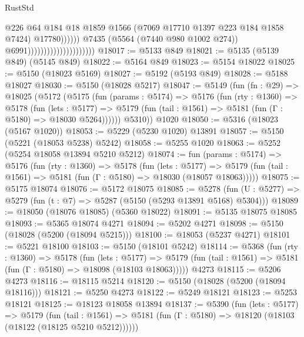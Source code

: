 \begin{lexlean}{RustStd}
\begin{coremodule}
                                                          @226
                                                          @64
                                                          @184
                                                          @18
                                                          @1859
                                                          @1566
                                                          (@7069 @17710 @1397 @223 @184 @1858 @7424)
                                                          @17780))))))
                                              @7435
                                              (@5564 (@7440 @980 @1002 @274))
                                              @6991)))))))))))))))))))))
@18017 := @5133 @849
@18021 := @5135 (@5139 @849) (@5145 @849)
@18022 := @5164 @849
@18023 := @5154 @18022
@18025 := @5150 (@18023 @5169)
@18027 := @5192 (@5193 @849)
@18028 := @5188 @18027
@18030 := @5150 (@18028 @5217)
@18047 := @5149
    (fun (fn : @29) =>
    @18025
      (@5172
        (@5175
          (fun (params : @5174) =>
          @5176
            (fun (rty : @1360) =>
            @5178
              (fun (lets : @5177) =>
              @5179 (fun (tail : @1561) => @5181 (fun (Γ : @5180) => @18030 @5264))))))
        @5310))
    @1020
@18050 := @5316 (@18023 (@5167 @1020))
@18053 := @5229 (@5230 @1020) @13891
@18057 := @5150 (@5221 (@18053 @5238) @5242)
@18058 := @5255 @1020
@18063 := @5252 (@5254 @18058 @13894 @5210 @5212)
@18074 := fun (params : @5174) =>
  @5176
    (fun (rty : @1360) =>
    @5178
      (fun (lets : @5177) =>
      @5179 (fun (tail : @1561) => @5181 (fun (Γ : @5180) => @18030 (@18057 @18063)))))
@18075 := @5175 @18074
@18076 := @5172 @18075
@18085 := @5278
    (fun (U : @5277) => @5279 (fun (t : @7) => @5287 (@5150 (@5293 @13891 @5168) @5304)))
@18089 := @18050 (@18076 @18085) (@5360 @18022)
@18091 := @5135 @18075 @18085
@18093 := @5365 @18074 @4271
@18094 := @5202 @4271
@18098 := @5150 (@18028 (@5200 (@18094 @5215)))
@18100 := @18053 (@5237 @4271)
@18101 := @5221 @18100
@18103 := @5150 (@18101 @5242)
@18114 := @5368
    (fun (rty : @1360) =>
    @5178
      (fun (lets : @5177) =>
      @5179 (fun (tail : @1561) => @5181 (fun (Γ : @5180) => @18098 (@18103 @18063)))))
    @4273
@18115 := @5206 @4273
@18116 := @18115 @5214
@18120 := @5150 (@18028 (@5200 (@18094 @18116)))
@18121 := @5250 @4273
@18122 := @5249 @18121
@18123 := @5253 @18121
@18125 := @18123 @18058 @13894
@18137 := @5390
    (fun (lets : @5177) =>
    @5179
      (fun (tail : @1561) =>
      @5181 (fun (Γ : @5180) => @18120 (@18103 (@18122 (@18125 @5210 @5212))))))

\end{coremodule}
\end{lexlean}
